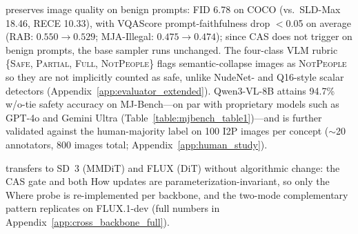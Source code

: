 \ours{} preserves image quality on benign prompts: FID 6.78 on COCO (vs.\ SLD-Max 18.46, RECE 10.33), with VQAScore prompt-faithfulness drop $<$0.05 on average (RAB: $0.550{\to}0.529$; MJA-Illegal: $0.475{\to}0.474$); since CAS does not trigger on benign prompts, the base sampler runs unchanged. The four-class VLM rubric \{\textsc{Safe}, \textsc{Partial}, \textsc{Full}, \textsc{NotPeople}\} flags semantic-collapse images as \textsc{NotPeople} so they are not implicitly counted as safe, unlike NudeNet- and Q16-style scalar detectors (Appendix~\ref{app:evaluator_extended}). Qwen3-VL-8B attains 94.7\% w/o-tie safety accuracy on MJ-Bench---on par with proprietary models such as GPT-4o and Gemini Ultra (Table~\ref{table:mjbench_table1})---and is further validated against the human-majority label on 100 I2P images per concept ($\sim$20 annotators, $800$ images total; Appendix~\ref{app:human_study}).

\ours{} transfers to SD~3 (MMDiT) and FLUX (DiT) without algorithmic change: the CAS gate and both How updates are parameterization-invariant, so only the Where probe is re-implemented per backbone, and the two-mode complementary pattern replicates on FLUX.1-dev (full numbers in Appendix~\ref{app:cross_backbone_full}).\label{subsec:cross_backbone}
